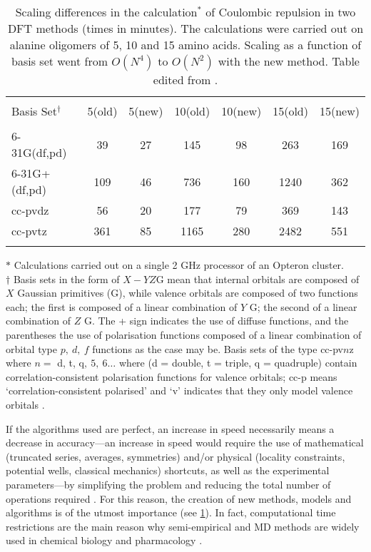 \begin{table}
	\begin{center}
		\caption[Scaling differences in the calculation of Coulombic repulsion in two DFT methods.]{Scaling differences in the calculation$ ^{*} $ of Coulombic repulsion in two DFT methods (times in minutes). The calculations were carried out on alanine oligomers of 5, 10 and 15 amino acids. Scaling as a function of basis set went from $ O(N^{4}) $ to $ O(N^{2}) $ with the new method. Table edited from \cite{qchem}.}\label{t:scale}
	    \begin{tabular}{lcccccc}
    		\hline\\[-4mm]
	    	Basis Set$ ^{\dag} $ & 5(old) & 5(new) & 10(old) & 10(new) & 15(old) & 15(new) \\
		    \hline\\[-4mm]
    		6-31G(df,pd) & 39    & 27    & 145   & 98    & 263   & 169 \\
	    	6-31G+(df,pd) & 109   & 46    & 736   & 160   & 1240  & 362 \\
		    cc-pvdz & 56    & 20    & 177   & 79    & 369   & 143 \\
    		cc-pvtz & 361   & 85    & 1165  & 280   & 2482  & 551 \\
	    	\hline\\[-4mm]
	    \end{tabular}
    \end{center}
    {\footnotesize $ * $ Calculations carried out on a single 2 GHz processor of an Opteron cluster.\\
	$ \dag $ Basis sets in the form of $ X-YZ $G mean that internal orbitals are composed of $ X $ Gaussian primitives (G), while valence orbitals are composed of two functions each; the first is composed of a linear combination of $ Y $ G; the second of a linear combination of $ Z $ G. The + sign indicates the use of diffuse functions, and the parentheses the use of polarisation functions composed of a linear combination of orbital type $ p,~d,~f $ functions as the case may be. Basis sets of the type cc-pv$ n $z where $ n = $ d, t, q$,~ 5,~ 6 \dots $ where (d = double, t = triple, q = quadruple) contain correlation-consistent polarisation functions for valence orbitals; cc-p means `correlation-consistent polarised' and `v' indicates that they only model valence orbitals \cite{book2,basisset1,basisset2}.}
\end{table}

If the algorithms used are perfect, an increase in speed necessarily means a decrease in accuracy---an increase in speed would require the use of mathematical (truncated series, averages, symmetries) and/or physical (locality constraints, potential wells, classical mechanics) shortcuts, as well as the experimental parameters---by simplifying the problem and reducing the total number of operations required \cite{molcas1}. For this reason, the creation of new methods, models and algorithms is of the utmost importance (see \cref{t:scale}). In fact, computational time restrictions are the main reason why semi-empirical and MD methods are widely used in chemical biology and pharmacology \cite{md2,pharm}.

